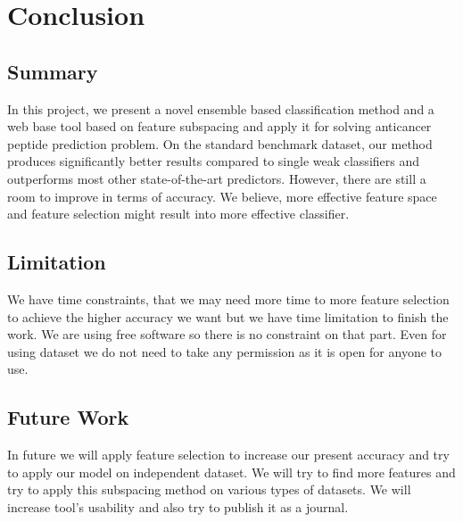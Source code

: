 \chapter{Conclusion} \label{Conclusion}

\ifpdf
    \graphicspath{{chapter_6/figures/PNG/}{chapter_6/figures/PDF/}{chapter_5/figures/}}
\else
    \graphicspath{{chapter_6/figures/EPS/}{chapter_6/figures/}}
\fi

\section{Summary}

In this project, we present a novel ensemble based classification method and a web base tool based on feature subspacing and apply it for solving anticancer peptide prediction problem. On the standard benchmark dataset, our method produces significantly better results compared to single weak classifiers and outperforms most other state-of-the-art predictors. However, there are still a room to improve in terms of accuracy. We believe, more effective feature space and feature selection might result into more effective classifier.

\section{Limitation}

We have time constraints, that we may need more time to more feature selection to achieve the higher accuracy we want but we have time limitation to finish the work. We are using free software so there is no constraint on that part. Even for using dataset we do not need to take any permission as it is open for anyone to use.

\section{Future Work}
In future we will apply feature selection to increase our present accuracy and try to apply our model on independent dataset. We will try to find more features and try to apply this subspacing method on various types of datasets. We will increase tool's usability and also try to publish it as a journal.

